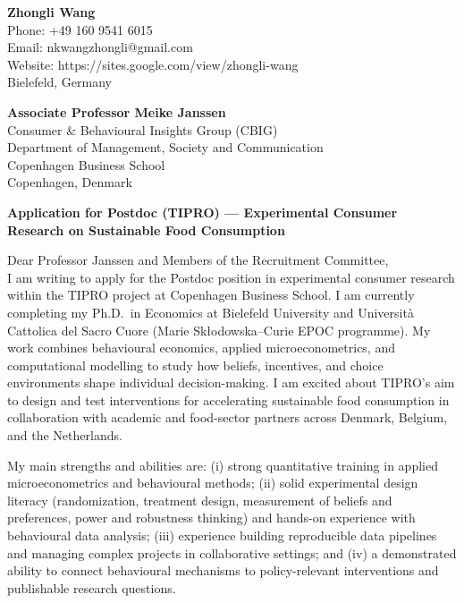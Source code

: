 \documentclass[11pt]{article}
\begin{document}
\noindent
\textbf{Zhongli Wang} \\
Phone: +49 160 9541 6015 \\
Email: nkwangzhongli@gmail.com \\
Website: https://sites.google.com/view/zhongli-wang \\
Bielefeld, Germany \\

\vspace{0.45cm}

\noindent
\textbf{Associate Professor Meike Janssen} \\
Consumer \& Behavioural Insights Group (CBIG) \\
Department of Management, Society and Communication \\
Copenhagen Business School \\
Copenhagen, Denmark \\

\vspace{0.35cm}

\noindent
\textbf{Application for Postdoc (TIPRO) --- Experimental Consumer Research on Sustainable Food Consumption} \\

\vspace{0.25cm}

\noindent Dear Professor Janssen and Members of the Recruitment Committee,\\[0.2cm]

I am writing to apply for the Postdoc position in experimental consumer research within the TIPRO project at Copenhagen Business School. I am currently completing my Ph.D.\ in Economics at Bielefeld University and Universit\`a Cattolica del Sacro Cuore (Marie Sk{\l}odowska--Curie EPOC programme). My work combines behavioural economics, applied microeconometrics, and computational modelling to study how beliefs, incentives, and choice environments shape individual decision-making. I am excited about TIPRO's aim to design and test interventions for accelerating sustainable food consumption in collaboration with academic and food-sector partners across Denmark, Belgium, and the Netherlands.

\vspace{0.15cm}
My main strengths and abilities are: (i) strong quantitative training in applied microeconometrics and behavioural methods; (ii) solid experimental design literacy (randomization, treatment design, measurement of beliefs and preferences, power and robustness thinking) and hands-on experience with behavioural data analysis; (iii) experience building reproducible data pipelines and managing complex projects in collaborative settings; and (iv) a demonstrated ability to connect behavioural mechanisms to policy-relevant interventions and publishable research questions.
\end{document}
